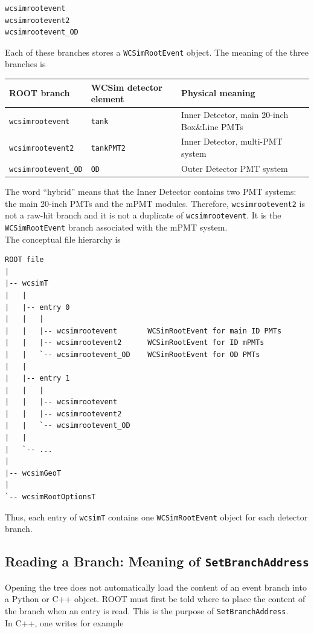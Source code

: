 \documentclass{article}
\numberwithin{table}{subsection}
\numberwithin{figure}{subsection}
\numberwithin{equation}{subsection}
\numberwithin{footnote}{subsection}
\begin{document}
\begin{lstlisting}[language=C++]
wcsimrootevent
wcsimrootevent2
wcsimrootevent_OD
\end{lstlisting}
Each of these branches stores a \texttt{WCSimRootEvent} object. The meaning of the three branches is
\begin{center}
\begin{tabular}{lll}
\hline
ROOT branch & WCSim detector element & Physical meaning \\
\hline
\texttt{wcsimrootevent} &
\texttt{tank} &
Inner Detector, main 20-inch Box\&Line PMTs \\

\texttt{wcsimrootevent2} &
\texttt{tankPMT2} &
Inner Detector, multi-PMT system \\

\texttt{wcsimrootevent\_OD} &
\texttt{OD} &
Outer Detector PMT system \\
\hline
\end{tabular}
\end{center}
The word ``hybrid'' means that the Inner Detector contains two PMT systems: the
main 20-inch PMTs and the mPMT modules. Therefore,
\texttt{wcsimrootevent2} is not a raw-hit branch and it is not a duplicate of
\texttt{wcsimrootevent}. It is the \texttt{WCSimRootEvent} branch associated
with the mPMT system.\\
The conceptual file hierarchy is
\begin{lstlisting}
ROOT file
|
|-- wcsimT
|   |
|   |-- entry 0
|   |   |
|   |   |-- wcsimrootevent       WCSimRootEvent for main ID PMTs
|   |   |-- wcsimrootevent2      WCSimRootEvent for ID mPMTs
|   |   `-- wcsimrootevent_OD    WCSimRootEvent for OD PMTs
|   |
|   |-- entry 1
|   |   |
|   |   |-- wcsimrootevent
|   |   |-- wcsimrootevent2
|   |   `-- wcsimrootevent_OD
|   |
|   `-- ...
|
|-- wcsimGeoT
|
`-- wcsimRootOptionsT
\end{lstlisting}
Thus, each entry of \texttt{wcsimT} contains one \texttt{WCSimRootEvent} object
for each detector branch.

\subsection{Reading a Branch: Meaning of \texttt{SetBranchAddress}}

Opening the tree does not automatically load the content of an event branch into
a Python or C++ object. ROOT must first be told where to place the content of the
branch when an entry is read. This is the purpose of \texttt{SetBranchAddress}.\\
In C++, one writes for example
\end{document}
